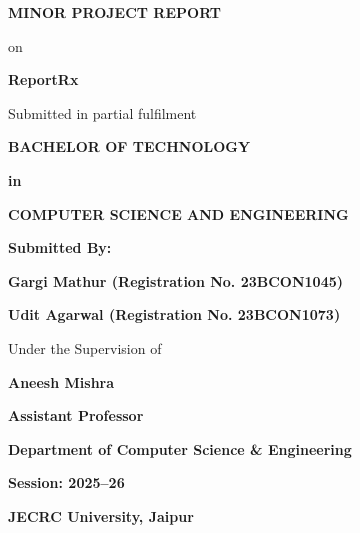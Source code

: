 \begin{titlepage}
    \thispagestyle{empty}
    \vspace*{\fill}
    \begin{center}
        {\fontsize{18pt}{22pt}\selectfont\bfseries MINOR PROJECT REPORT\par}
        \vspace{0.5cm}
        {\Large on\par}
        \vspace{0.5cm}
        {\Huge\bfseries ReportRx\par}
        \vspace{1cm}
        {\Large Submitted in partial fulfilment\par}
        \vspace{0.5cm}
        {\Large\bfseries BACHELOR OF TECHNOLOGY\par}
        {\Large\bfseries in\par}
        {\Large\bfseries COMPUTER SCIENCE AND ENGINEERING\par}

        \vspace{1.5cm}

        {\large\bfseries Submitted By:\par}
        \vspace{0.3cm}
        {\large\bfseries Gargi Mathur (Registration No. 23BCON1045)\par}
        {\large\bfseries Udit Agarwal (Registration No. 23BCON1073)\par}

        \vspace{0.5cm}
        {\large Under the Supervision of\par}
        {\large\bfseries Aneesh Mishra\par}
        {\large\bfseries Assistant Professor\par}

        \vspace{1.5cm}

        {\large\bfseries Department of Computer Science \& Engineering\par}
        {\large\bfseries Session: 2025--26\par}
        {\large\bfseries JECRC University, Jaipur\par}
    \end{center}
    \vspace*{\fill}
    \restoregeometry
\end{titlepage}
